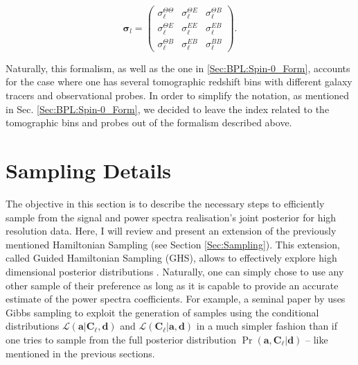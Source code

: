 \begin{equation}
\label{eqn::chCmbPol_defSigma_l}
\boldsymbol{\sigma}_l=\left(
\begin{array}{ccc}
\sigma_{\ell}^{\Theta\Theta} & \sigma_{\ell}^{\Theta E} & \sigma_{\ell}^{\Theta B} \\
\sigma_{\ell}^{\Theta E} & \sigma_{\ell}^{EE} & \sigma_{\ell}^{EB} \\
\sigma_{\ell}^{\Theta B} & \sigma_{\ell}^{EB} & \sigma_{\ell}^{BB}
\end{array} \right).
\end{equation}

\qquad Naturally, this formalism, as well as the one in \ref{Sec:BPL:Spin-0_Form}, accounts for the case where one has several tomographic redshift bins with different galaxy tracers and observational probes. In order to simplify the notation, as mentioned in Sec. \ref{Sec:BPL:Spin-0_Form}, we decided to leave the index related to the tomographic bins and probes out of the formalism described above.

\section{Sampling Details}\label{Sec:BPL:Sampling}
The objective in this section is to describe the necessary steps to efficiently sample from the signal and power spectra realisation's joint posterior for high resolution data. Here, I will review and present an extension of the previously mentioned Hamiltonian Sampling (see Section \ref{Sec:Sampling}). This extension, called Guided Hamiltonian Sampling (GHS), allows to effectively explore high dimensional posterior distributions \citep{SreeThesis,2013-GuidedHamiltonian}. Naturally, one can simply chose to use any other sample of their preference as long as it is capable to provide an accurate estimate of the power spectra coefficients. For example, a seminal paper by \cite{Wandelt2004} uses Gibbs sampling \citep{Geman1984,Casella1992} to exploit the generation of samples using the conditional distributions $\mathcal{L}(\mathbf{a}|\textbf{C}_{\ell},\mathbf{d})$ and $\mathcal{L}(\textbf{C}_{\ell}|\mathbf{a},\mathbf{d})$ in a much simpler fashion than if one tries to sample from the full posterior distribution $\Pr(\mathbf{a},\textbf{C}_{\ell}|\mathbf{d})$ -- like mentioned in the previous sections.

